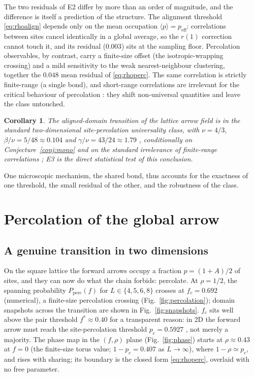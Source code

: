 \documentclass[11pt]{article}
\newtheorem{corollary}{Corollary}
\newcommand{\peff}{p_{\mathrm{eff}}}
\newcommand{\Pperc}{P_{\mathrm{perc}}}
\begin{document}
The two residuals of E2 differ by more than an order of magnitude, and the
difference is itself a prediction of the structure. The alignment threshold
\eqref{eq:rhoalign} depends only on the mean occupation
$\langle p \rangle = \peff$: correlations between sites cancel identically
in a global average, so the $r(1)$ correction cannot touch it, and its
residual ($0.003$) sits at the sampling floor. Percolation observables, by
contrast, carry a finite-size offset (the isotropic-wrapping crossing) and a
mild sensitivity to the weak nearest-neighbour clustering, together the
$0.048$ mean residual of \eqref{eq:rhoperc}. The same correlation is strictly finite-range (a single
bond), and short-range correlations are irrelevant for the critical
behaviour of percolation \cite{stauffer,harris1974,weinrib}: they shift non-universal
quantities and leave the class untouched.

\begin{corollary}
The aligned-domain transition of the lattice arrow field is in the standard
two-dimensional site-percolation universality class, with $\nu = 4/3$,
$\beta/\nu = 5/48 \approx 0.104$ and $\gamma/\nu = 43/24 \approx 1.79$
\cite{stauffer,dennijs}, conditionally on Conjecture~\ref{conj:mono} and on the standard
irrelevance of finite-range correlations \cite{harris1974,weinrib,weinrib1984};
E3 is the direct statistical test of this conclusion.
\end{corollary}

One microscopic mechanism, the shared bond, thus accounts for the exactness
of one threshold, the small residual of the other, and the robustness of
the class.

\section{Percolation of the global arrow}
\label{sec:global}

\subsection{A genuine transition in two dimensions}

On the square lattice the forward arrows occupy a fraction $p = (1+A)/2$ of
sites, and they can now do what the chain forbids: percolate. At
$\rho = 1/2$, the spanning probability $\Pperc(f)$ for $L \in \{4,5,6,8\}$
crosses at $f_c = 0.692$ (numerical), a finite-size percolation crossing
(Fig.~\ref{fig:percolation}); domain snapshots across the transition are
shown in Fig.~\ref{fig:snapshots}. $f_c$ sits well above the pair threshold
$f^* \approx 0.40$ for a transparent reason: in 2D the forward arrow must
reach the site-percolation threshold $p_c = 0.5927$ \cite{newmanziff}, not
merely a majority. The phase map in the $(f,\rho)$ plane
(Fig.~\ref{fig:phase}) starts at $\rho \approx 0.43$ at $f = 0$ (the finite-size
torus value; $1-p_c = 0.407$ as $L\to\infty$), where $1-\rho \simeq p_c$, and
rises with sharing; its boundary is the closed form \eqref{eq:rhoperc},
overlaid with no free parameter.
\end{document}

